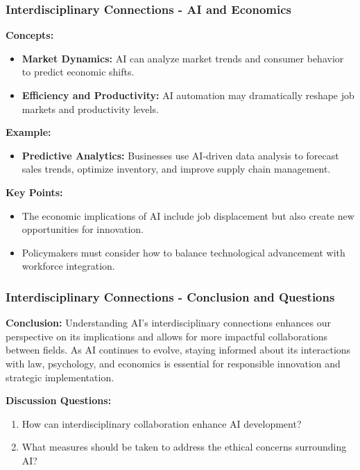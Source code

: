 \documentclass[aspectratio=169]{beamer}
\begin{document}
\begin{frame}[fragile]
    \frametitle{Interdisciplinary Connections - AI and Economics}
    \textbf{Concepts:}
    \begin{itemize}
        \item \textbf{Market Dynamics:} AI can analyze market trends and consumer behavior to predict economic shifts.
        \item \textbf{Efficiency and Productivity:} AI automation may dramatically reshape job markets and productivity levels.
    \end{itemize}

    \textbf{Example:}
    \begin{itemize}
        \item \textbf{Predictive Analytics:} Businesses use AI-driven data analysis to forecast sales trends, optimize inventory, and improve supply chain management.
    \end{itemize}

    \textbf{Key Points:}
    \begin{itemize}
        \item The economic implications of AI include job displacement but also create new opportunities for innovation.
        \item Policymakers must consider how to balance technological advancement with workforce integration.
    \end{itemize}
\end{frame}

\begin{frame}[fragile]
    \frametitle{Interdisciplinary Connections - Conclusion and Questions}
    \textbf{Conclusion:}
    Understanding AI’s interdisciplinary connections enhances our perspective on its implications and allows for more impactful collaborations between fields. As AI continues to evolve, staying informed about its interactions with law, psychology, and economics is essential for responsible innovation and strategic implementation.

    \textbf{Discussion Questions:}
    \begin{enumerate}
        \item How can interdisciplinary collaboration enhance AI development?
        \item What measures should be taken to address the ethical concerns surrounding AI?
    \end{enumerate}
\end{frame}
\end{document}
